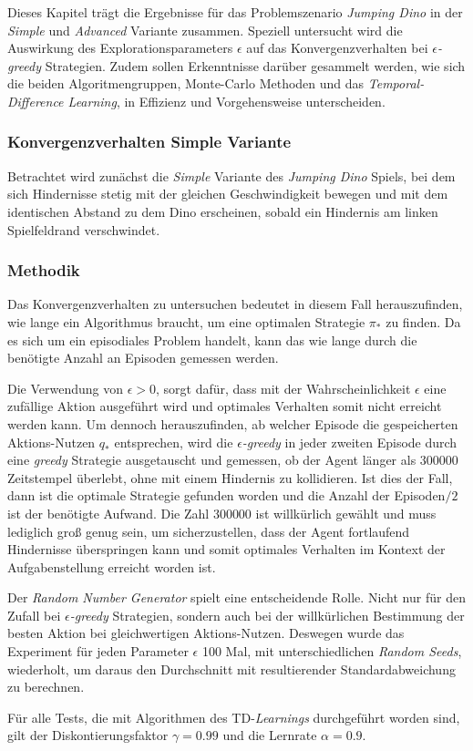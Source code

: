 Dieses Kapitel trägt die Ergebnisse für das Problemszenario \textit{Jumping Dino} in der \textit{Simple} und \textit{Advanced} Variante zusammen. Speziell untersucht wird die Auswirkung des Explorationsparameters $\epsilon$ auf das Konvergenzverhalten bei $\epsilon$\textit{-greedy} Strategien. Zudem sollen Erkenntnisse darüber gesammelt werden, wie sich die beiden Algoritmengruppen, Monte-Carlo Methoden und das \textit{Temporal-Difference Learning}, in Effizienz und Vorgehensweise unterscheiden.


\subsubsection{Konvergenzverhalten Simple Variante}\label{sec:resJumpSimple}
Betrachtet wird zunächst die \textit{Simple} Variante des \textit{Jumping Dino} Spiels, bei dem sich Hindernisse stetig mit der gleichen Geschwindigkeit bewegen und mit dem identischen Abstand zu dem Dino erscheinen, sobald ein Hindernis am linken Spielfeldrand verschwindet.

\subsubsection*{Methodik}
 Das Konvergenzverhalten zu untersuchen bedeutet in diesem Fall herauszufinden, wie lange ein Algorithmus braucht, um eine optimalen Strategie $\pi_*$ zu finden. Da es sich um ein episodiales Problem handelt, kann das \glqq wie lange\grqq{} durch die benötigte Anzahl an Episoden gemessen werden. 
\par
Die Verwendung von $\epsilon > 0$, sorgt dafür, dass mit der Wahrscheinlichkeit $\epsilon$ eine zufällige Aktion ausgeführt wird und optimales Verhalten somit nicht erreicht werden kann. Um dennoch herauszufinden, ab welcher Episode die gespeicherten Aktions-Nutzen $q_*$ entsprechen, wird die $\epsilon$\textit{-greedy} in jeder zweiten Episode durch eine \textit{greedy} Strategie ausgetauscht und gemessen, ob der Agent länger als 300000 Zeitstempel überlebt, ohne mit einem Hindernis zu kollidieren. Ist dies der Fall, dann ist die optimale Strategie gefunden worden und die Anzahl der Episoden$/2$ ist der benötigte Aufwand. Die Zahl 300000 ist willkürlich gewählt und muss lediglich groß genug sein, um sicherzustellen, dass der Agent fortlaufend Hindernisse überspringen kann und somit optimales Verhalten im Kontext der Aufgabenstellung erreicht worden ist.  
\par 
Der \textit{Random Number Generator} spielt eine entscheidende Rolle. Nicht nur für den Zufall bei $\epsilon$\textit{-greedy} Strategien, sondern auch bei der willkürlichen Bestimmung der besten Aktion bei gleichwertigen Aktions-Nutzen. Deswegen wurde das Experiment für jeden Parameter $\epsilon$ 100 Mal, mit unterschiedlichen \textit{Random Seeds}, wiederholt, um daraus den Durchschnitt mit resultierender Standardabweichung zu berechnen.
\par 
Für alle Tests, die mit Algorithmen des TD-\textit{Learnings} durchgeführt worden sind, gilt der Diskontierungsfaktor $\gamma = 0.99$ und die Lernrate $\alpha = 0.9$.
\par 

